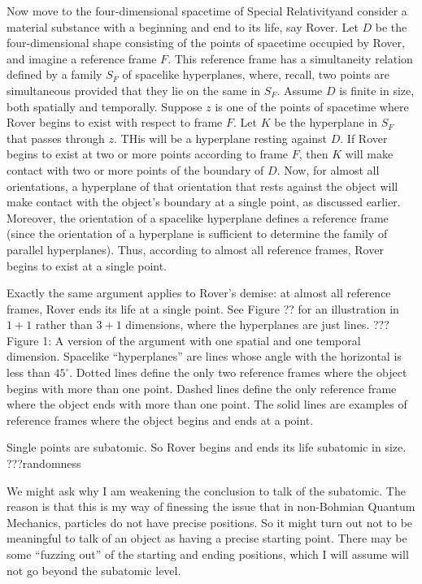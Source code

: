 Now move to the four-dimensional spacetime of Special Relativityand consider a material substance with a beginning and end to 
its life, say Rover. Let $D$ be the four-dimensional shape consisting of the points of spacetime occupied by Rover, and 
imagine a reference frame $F$. This reference frame has a simultaneity relation defined by a family $S_F$ of spacelike 
hyperplanes, where, recall, two points are simultaneous provided that they lie on the same in $S_F$. Assume $D$ is 
finite in size, both spatially and temporally. Suppose $z$ is one of the points of 
spacetime where Rover begins to exist with respect to frame $F$. Let $K$ be the hyperplane in $S_F$ that passes through 
$z$. THis will be a hyperplane resting against $D$. If Rover begins to exist at two or more points according to frame $F$, 
then $K$ will make contact with two or more points of the boundary of $D$. Now, for almost all 
orientations, a hyperplane of that orientation that rests against the object will make contact with the object’s boundary 
at a single point, as discussed earlier. Moreover, the orientation of a spacelike hyperplane defines a reference frame (since the
orientation of a hyperplane is sufficient to determine the family of parallel hyperplanes). Thus, according to almost all 
reference frames, Rover begins to exist at a single point. 

Exactly the same argument applies to Rover’s demise: at almost all reference frames, Rover ends its life at a single point. 
See Figure ?? for an illustration in $1+1$ rather than $3+1$ dimensions, where the hyperplanes are just lines.
??? Figure 1: A version of the argument with one spatial and one temporal dimension. Spacelike ``hyperplanes'' are lines whose angle with the horizontal is 
less than $45^\circ$. Dotted lines define the only two reference frames where the object begins with more than one point. Dashed lines define the only reference frame where the object ends with more than one point. The solid lines are examples of reference frames where the object begins and ends at a point.

Single points are subatomic. So Rover begins and ends its life subatomic in size. ???randomness

We might ask why I am weakening the 
conclusion to talk of the subatomic. The reason is that this is my way of finessing the issue that in non-Bohmian Quantum 
Mechanics, particles do not have precise positions. So it might turn out not to be meaningful to talk of an object as 
having a precise starting point. There may be some ``fuzzing out'' of the starting and ending positions, which I will 
assume will not go beyond the subatomic level. 

